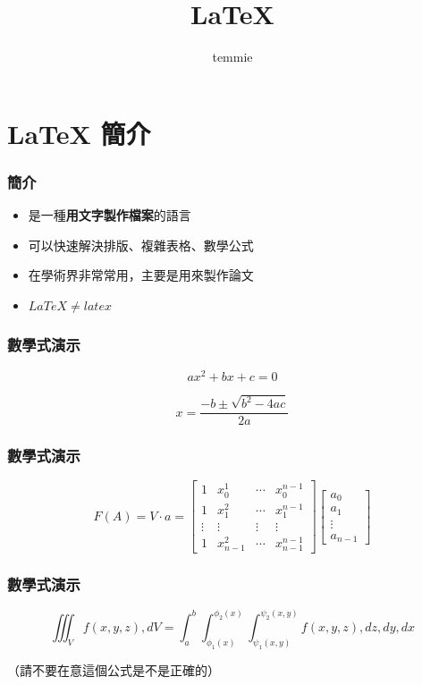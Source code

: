 \documentclass[mathserif]{beamer}
\title{LaTeX}
\author{temmie}
\date{}
\begin{document}
\begin{frame}
    \titlepage
\end{frame}

\begin{frame}
    \tableofcontents
\end{frame}

\section{LaTeX 簡介}

\begin{frame}
    \frametitle{簡介}
    \begin{itemize}
        \item 是一種\textbf{用文字製作檔案}的語言
        \item 可以快速解決排版、複雜表格、數學公式
        \item 在學術界非常常用，主要是用來製作論文
        \vspace{0.5cm}
        \item $LaTeX \neq latex$
    \end{itemize}
\end{frame}

\begin{frame}
    \frametitle{數學式演示}
    $$ax^2+bx+c=0$$

    $$x=\frac{-b\pm \sqrt{b^2-4ac}}{2a}$$
\end{frame}

\begin{frame}
    \frametitle{數學式演示}
    $$F(A) = V \cdot a = \begin{bmatrix}
    1 & x_0^1 & \cdots & x_0^{n-1} \\
    1 & x_1^2 & \cdots & x_1^{n-1} \\
    \vdots & \vdots & \vdots & \vdots \\
    1 & x_{n-1}^2 & \cdots & x_{n-1}^{n-1}
    \end{bmatrix}
    \begin{bmatrix}
    a_0 \\
    a_1 \\
    \vdots \\
    a_{n-1}
    \end{bmatrix}$$
\end{frame}

\begin{frame}
    \frametitle{數學式演示}
    \begin{equation}
        \label{eq:multivariable_integral}
        \iiint_V f(x,y,z),dV = \int_a^b \int_{\phi_1(x)}^{\phi_2(x)} \int_{\psi_1(x,y)}^{\psi_2(x,y)} f(x,y,z),dz,dy,dx
    \end{equation}
    \begin{center}
        （請不要在意這個公式是不是正確的）
    \end{center}
\end{frame}
\end{document}
